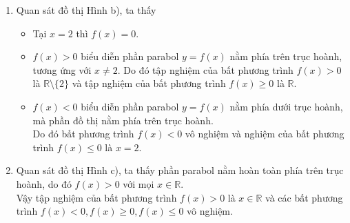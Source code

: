 \begin{bt}
{\begin{enumerate}
			\begin{itemize}
				\item $f(x)>0$ biểu diễn phần parabol $y=f(x)$ nằm phía trên trục hoành, tương ứng với $x<1$ hoặc $x>4$.\\
				Do đó tập nghiệm của bất phương trình $f(x)>0$ là $(-\infty; 1) \cup (4;+\infty)$ và tập nghiệm của bất phương trình $f(x) \geq 0$ là $(-\infty; 1] \cup [4;+\infty)$.
				\item $f(x)<0$ biểu diễn phần parabol $y=f(x)$ nằm phía dưới trục hoành, tương ứng với $1<x<4$.\\
				Do đó tập nghiệm của bất phương trình $f(x)<0$ là $(1; 4)$
				và tập nghiệm của bất phương trình $f(x) \leq 0$ là $[1; 4]$.
			\end{itemize}
			\item Quan sát đồ thị Hình b), ta thấy
			\begin{itemize}
				\item Tại $x=2$ thì $f(x)=0$.
				\item $f(x)>0$ biểu diễn phần parabol $y=f(x)$ nằm phía trên trục hoành, tương ứng với $x \neq 2$.
				Do đó tập nghiệm của bất phương trình $f(x)>0$ là $\mathbb{R} \setminus \{2\}$ và tập nghiệm của bất phương trình $f(x) \geq 0$ là $\mathbb{R}$.
				\item $f(x)<0$ biểu diễn phần parabol $y=f(x)$ nằm phía dưới trục hoành, mà phần đồ thị nằm phía trên trục hoành.\\
				Do đó bất phương trình $f(x)<0$ vô nghiệm và nghiệm của bất phương trình $f(x) \leq 0$ là $x=2$.
			\end{itemize}
			\item Quan sát đồ thị Hình c), ta thấy phần parabol nằm hoàn toàn phía trên trục hoành, do đó $f(x)>0$ với mọi $x \in \mathbb{R}$.\\
			Vậy tập nghiệm của bất phương trình $f(x)>0$ là $x \in \mathbb{R}$ và các bất phương trình $f(x)<0, f(x) \geq 0, f(x) \leq 0$ vô nghiệm.
		\end{enumerate}
	}
\end{bt}

